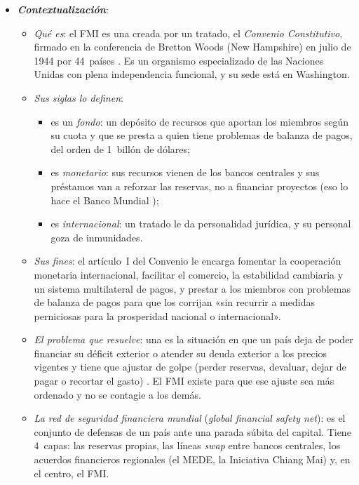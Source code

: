 \documentclass[11pt]{article}
\begin{document}
\begin{itemize}
\item \textbf{\emph{Contextualización}}:
  \begin{itemize}
  \item \emph{Qué es}: el FMI es una  creada por un tratado, el \emph{Convenio Constitutivo}, firmado en la conferencia de Bretton Woods (New Hampshire) en julio de 1944 por 44~países . Es un organismo especializado de las Naciones Unidas con plena independencia funcional, y su sede está en Washington.
  \item \emph{Sus siglas lo definen}:
    \begin{itemize}
    \item es un \emph{fondo}: un depósito de recursos que aportan los miembros según su cuota y que se presta a quien tiene problemas de balanza de pagos, del orden de 1~billón de dólares;
    \item es \emph{monetario}: sus recursos vienen de los bancos centrales y sus préstamos van a reforzar las reservas, no a financiar proyectos (eso lo hace el Banco Mundial );
    \item es \emph{internacional}: un tratado le da personalidad jurídica, y su personal goza de inmunidades.
    \end{itemize}
  \item \emph{Sus fines}: el artículo~I del Convenio le encarga fomentar la cooperación monetaria internacional, facilitar el comercio, la estabilidad cambiaria y un sistema multilateral de pagos, y prestar a los miembros con problemas de balanza de pagos para que los corrijan «sin recurrir a medidas perniciosas para la prosperidad nacional o internacional»\nocite{FMIConvenio}.
  \item \emph{El problema que resuelve}: una  es la situación en que un país deja de poder financiar su déficit exterior o atender su deuda exterior a los precios vigentes y tiene que ajustar de golpe (perder reservas, devaluar, dejar de pagar o recortar el gasto) . El FMI existe para que ese ajuste sea más ordenado y no se contagie a los demás.
  \item \emph{La red de seguridad financiera mundial} (\emph{global financial safety net}): es el conjunto de defensas de un país ante una parada súbita del capital. Tiene 4~capas: las reservas propias, las líneas \emph{swap} entre bancos centrales, los acuerdos financieros regionales (el MEDE, la Iniciativa Chiang Mai) y, en el centro, el FMI\nocite{FMI2016GFSN}.
  \end{itemize}


\end{itemize}
\end{document}
